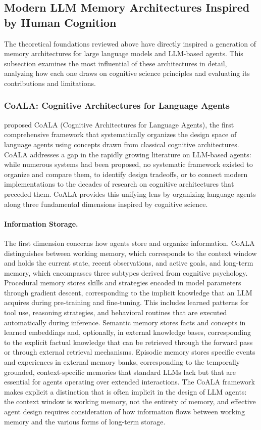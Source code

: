 \subsection{Modern LLM Memory Architectures Inspired by Human Cognition}

The theoretical foundations reviewed above have directly inspired a generation of memory architectures for large language models and LLM-based agents. This subsection examines the most influential of these architectures in detail, analyzing how each one draws on cognitive science principles and evaluating its contributions and limitations.

\subsubsection{CoALA: Cognitive Architectures for Language Agents}

\citet{sumers2024cognitive} proposed CoALA (Cognitive Architectures for Language Agents), the first comprehensive framework that systematically organizes the design space of language agents using concepts drawn from classical cognitive architectures. CoALA addresses a gap in the rapidly growing literature on LLM-based agents: while numerous systems had been proposed, no systematic framework existed to organize and compare them, to identify design tradeoffs, or to connect modern implementations to the decades of research on cognitive architectures that preceded them. CoALA provides this unifying lens by organizing language agents along three fundamental dimensions inspired by cognitive science.

\paragraph{Information Storage.} The first dimension concerns how agents store and organize information. CoALA distinguishes between working memory, which corresponds to the context window and holds the current state, recent observations, and active goals, and long-term memory, which encompasses three subtypes derived from cognitive psychology. Procedural memory stores skills and strategies encoded in model parameters through gradient descent, corresponding to the implicit knowledge that an LLM acquires during pre-training and fine-tuning. This includes learned patterns for tool use, reasoning strategies, and behavioral routines that are executed automatically during inference. Semantic memory stores facts and concepts in learned embeddings and, optionally, in external knowledge bases, corresponding to the explicit factual knowledge that can be retrieved through the forward pass or through external retrieval mechanisms. Episodic memory stores specific events and experiences in external memory banks, corresponding to the temporally grounded, context-specific memories that standard LLMs lack but that are essential for agents operating over extended interactions. The CoALA framework makes explicit a distinction that is often implicit in the design of LLM agents: the context window is working memory, not the entirety of memory, and effective agent design requires consideration of how information flows between working memory and the various forms of long-term storage.

